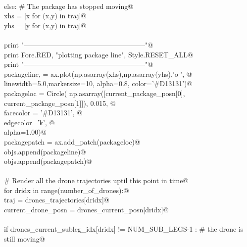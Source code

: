 \documentclass[10.0pt]{report}
\begin{document}
\begin{appendices}
\begin{flushleft}
\begin{list}{}{}
\mbox{}\verb@@\\
\mbox{}\verb@            else: # The package has stopped moving@\\
\mbox{}\verb@                  xhs = [x for (x,y) in traj]@\\
\mbox{}\verb@                  yhs = [y for (x,y) in traj]@\\
\mbox{}\verb@@\\
\mbox{}\verb@            print "-----------------------------------------------------"@\\
\mbox{}\verb@            print Fore.RED, "plotting package line", Style.RESET_ALL@\\
\mbox{}\verb@            print "-----------------------------------------------------"@\\
\mbox{}\verb@            packageline, = ax.plot(np.asarray(xhs),np.asarray(yhs),'o-', @\\
\mbox{}\verb@                                   linewidth=5.0,markersize=10, alpha=0.8, color='#D13131')@\\
\mbox{}\verb@            packageloc   = Circle( np.asarray([current_package_posn[0], current_package_posn[1]]), 0.015, @\\
\mbox{}\verb@                                    facecolor = '#D13131', @\\
\mbox{}\verb@                                    edgecolor='k',  @\\
\mbox{}\verb@                                    alpha=1.00)@\\
\mbox{}\verb@            packagepatch = ax.add_patch(packageloc)@\\
\mbox{}\verb@            objs.append(packageline)@\\
\mbox{}\verb@            objs.append(packagepatch)@\\
\mbox{}\verb@@\\
\mbox{}\verb@        # Render all the drone trajectories   uptil this point in time@\\
\mbox{}\verb@        for dridx in range(number_of_drones):@\\
\mbox{}\verb@            traj                 = drones_trajectories[dridx]@\\
\mbox{}\verb@            current_drone_posn = drones_current_posn[dridx]@\\
\mbox{}\verb@@\\
\mbox{}\verb@            if drones_current_subleg_idx[dridx] != NUM_SUB_LEGS-1 : # the drone is still moving@\\

\end{list}
\end{flushleft}
\end{appendices}
\end{document}
